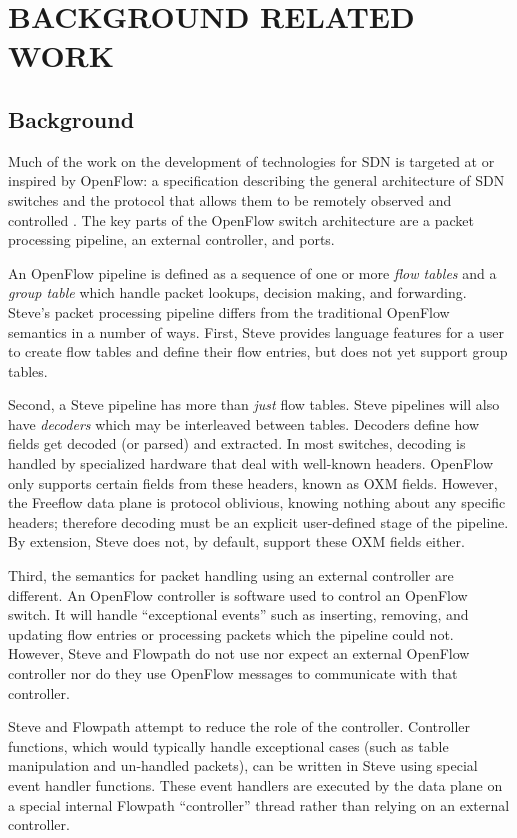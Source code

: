 \chapter{BACKGROUND RELATED WORK}
\label{ch:related}

\section{Background}
\label{rel:openflow}

Much of the work on the development of technologies for SDN is targeted at or inspired by OpenFlow: a specification describing the general architecture of SDN switches and the protocol that allows them to be remotely observed and controlled \cite{openflow_spec}. The key parts of the OpenFlow switch architecture are a packet processing pipeline, an external controller, and ports.

An OpenFlow pipeline is defined as a sequence
of one or more \textit{flow tables} and a \textit{group table} which handle
packet lookups, decision making, and forwarding. Steve's packet processing pipeline differs from the traditional OpenFlow
semantics in a number of ways. First,
Steve provides language features for a user to create flow tables and define
their flow entries, but does not yet support group tables.

Second, a Steve pipeline has more than \textit{just} flow tables. Steve
pipelines will also have \textit{decoders} which may be interleaved between
tables. Decoders define how fields get decoded (or parsed) and extracted. In
most switches, decoding is handled by specialized hardware that deal with
well-known headers. OpenFlow only supports certain fields from these headers,
known as OXM fields. However, the Freeflow data plane is
protocol oblivious, knowing nothing about any specific headers; therefore
decoding must be an explicit user-defined stage of the pipeline. By extension,
Steve does not, by default, support these OXM fields either.

Third, the semantics for packet handling using an external controller are different. An OpenFlow controller is software used to control an OpenFlow switch. It will handle ``exceptional events'' such as inserting,
removing, and updating flow entries or processing packets which the pipeline
could not. However, Steve and Flowpath do not use nor expect an external
OpenFlow controller nor do they use OpenFlow messages to communicate with that
controller.

Steve and Flowpath attempt to reduce the role of the controller. Controller
functions, which would typically handle exceptional cases (such as table
manipulation and un-handled packets), can be written in Steve using special
event handler functions. These event handlers are executed by the data plane
on a special internal Flowpath ``controller'' thread rather than relying on an
external controller.

